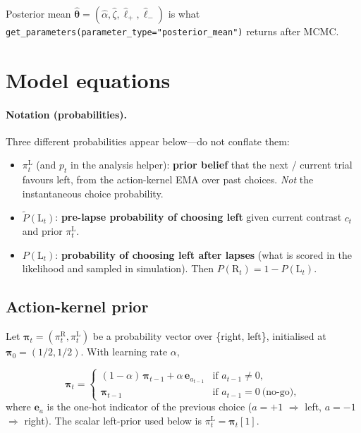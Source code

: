 \documentclass[11pt]{article}
\begin{document}
Posterior mean
\(\hat{\bm\theta}=(\hat\alpha,\hat\zeta,\hat\ell_+,\hat\ell_-)\)
is what \texttt{get\_parameters(parameter\_type="posterior\_mean")}
returns after MCMC.

\section{Model equations}

\paragraph{Notation (probabilities).}
Three different probabilities appear below---do not conflate them:
\begin{itemize}
\item \(\pi_t^{\mathrm{L}}\) (and \(p_t\) in the analysis helper):
  \textbf{prior belief} that the next / current trial favours left,
  from the action-kernel EMA over past choices.
  \emph{Not} the instantaneous choice probability.
\item \(\tilde P(\mathrm{L}_t)\):
  \textbf{pre-lapse probability of choosing left}
  given current contrast \(c_t\) and prior \(\pi_t^{\mathrm{L}}\).
\item \(P(\mathrm{L}_t)\):
  \textbf{probability of choosing left after lapses}
  (what is scored in the likelihood and sampled in simulation).
  Then \(P(\mathrm{R}_t)=1-P(\mathrm{L}_t)\).
\end{itemize}

\subsection{Action-kernel prior}

Let \(\bm\pi_t=(\pi_t^{\mathrm{R}},\pi_t^{\mathrm{L}})\) be a probability
vector over \{right, left\}, initialised at
\(\bm\pi_0=(1/2,1/2)\). With learning rate \(\alpha\),

\begin{equation}
\label{eq:prior-update}
\bm\pi_t
=
\begin{cases}
(1-\alpha)\,\bm\pi_{t-1}
+ \alpha\,\mathbf{e}_{a_{t-1}}
& \text{if } a_{t-1}\neq 0,\\[0.4em]
\bm\pi_{t-1}
& \text{if } a_{t-1}=0\ \text{(no-go)},
\end{cases}
\end{equation}
where \(\mathbf{e}_{a}\) is the one-hot indicator of the previous choice
(\(a=+1\) \(\Rightarrow\) left, \(a=-1\) \(\Rightarrow\) right).
The scalar left-prior used below is \(\pi_t^{\mathrm{L}}=\bm\pi_t[1]\).
\end{document}
